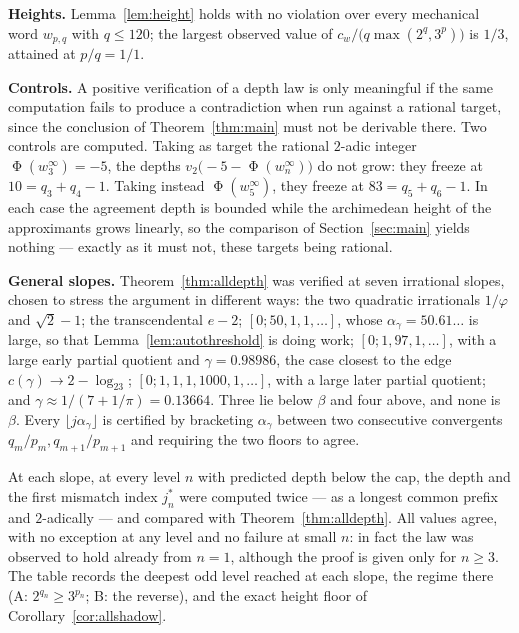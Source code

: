 \documentclass[11pt,reqno]{amsart}
\theoremstyle{plain}
\theoremstyle{definition}
\newcommand{\vt}{v_2}
\DeclareMathOperator{\Ph}{\Phi}
\begin{document}
\noindent\textbf{Heights.} Lemma~\ref{lem:height} holds with no violation over
every mechanical word $w_{p,q}$ with $q\le120$; the largest observed value of
$c_w/\bigl(q\max(2^{q},3^{p})\bigr)$ is $1/3$, attained at $p/q=1/1$.

\noindent\textbf{Controls.} A positive verification of a depth law is only
meaningful if the same computation fails to produce a contradiction when run
against a rational target, since the conclusion of Theorem~\ref{thm:main} must
not be derivable there. Two controls are computed. Taking as target the rational
$2$-adic integer $\Ph(w_3^\infty)=-5$, the depths
$\vt\bigl(-5-\Ph(w_n^\infty)\bigr)$ do not grow: they freeze at $10=q_3+q_4-1$.
Taking instead $\Ph(w_5^\infty)$, they freeze at $83=q_5+q_6-1$. In each case the
agreement depth is bounded while the archimedean height of the approximants grows
linearly, so the comparison of Section~\ref{sec:main} yields nothing --- exactly
as it must not, these targets being rational.

\medskip
\noindent\textbf{General slopes.} Theorem~\ref{thm:alldepth} was verified at
seven irrational slopes, chosen to stress the argument in different ways: the
two quadratic irrationals $1/\varphi$ and $\sqrt2-1$; the transcendental $e-2$;
$[0;50,1,1,\dots]$, whose $\alpha_\gamma=50.61\ldots$ is large, so that
Lemma~\ref{lem:autothreshold} is doing work; $[0;1,97,1,\dots]$, with a large
early partial quotient and $\gamma=0.98986$, the case closest to the edge
$c(\gamma)\to2-\log_23$; $[0;1,1,1,1000,1,\dots]$, with a large later partial
quotient; and $\gamma\approx1/(7+1/\pi)=0.13664$. Three lie below $\beta$ and
four above, and none is $\beta$. Every $\lfloor j\alpha_\gamma\rfloor$ is
certified by bracketing $\alpha_\gamma$ between two consecutive convergents
$q_m/p_m,q_{m+1}/p_{m+1}$ and requiring the two floors to agree.

At each slope, at every level $n$ with predicted depth below the cap, the depth
and the first mismatch index $j^{*}_n$ were computed twice --- as a longest
common prefix and $2$-adically --- and compared with
Theorem~\ref{thm:alldepth}. All values agree, with no exception at any level and
no failure at small $n$: in fact the law was observed to hold already from
$n=1$, although the proof is given only for $n\ge3$. The table records the
deepest odd level reached at each slope, the regime there (A: $2^{q_n}\ge
3^{p_n}$; B: the reverse), and the exact height floor of
Corollary~\ref{cor:allshadow}.
\end{document}
